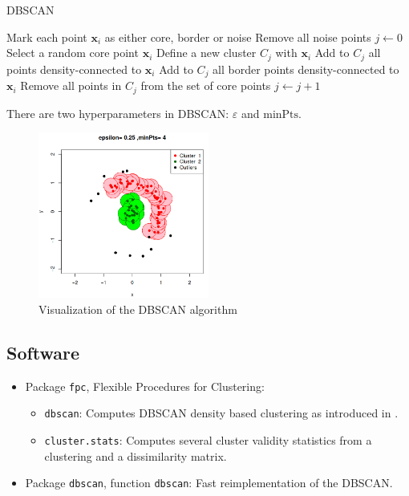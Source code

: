 \begin{algorithm}{DBSCAN}{}
    \begin{algorithmic}[1]
        \State Mark each point $\boldsymbol{x}_i$ as either core, border or noise
        \State Remove all noise points
        \State $j \gets 0$
            \State Select a random core point $\boldsymbol{x}_i$
            \State Define a new cluster $C_j$ with $\boldsymbol{x}_i$
            \State Add to $C_j$ all points density-connected to $\boldsymbol{x}_i$
            \State Add to $C_j$ all border points density-connected to $\boldsymbol{x}_i$
            \State Remove all points in $C_j$ from the set of core points
            \State $j \gets j + 1$
        \EndWhile
    \EndProcedure
\end{algorithmic}
\tcblower
\begin{marker}
There are two hyperparameters in DBSCAN: $\varepsilon$ and $\text{minPts}$.
\end{marker}
\end{algorithm}

\begin{figure}[H]
    \includegraphics[width=0.5\textwidth]{../figures/dbscan_eps_minpts}
    \caption{Visualization of the DBSCAN algorithm}
\end{figure}

\subsection{Software}

\begin{itemize}
	\item Package \texttt{fpc}, Flexible Procedures for Clustering:
	      \begin{itemize}
		      \item \texttt{dbscan}: Computes DBSCAN density based clustering as introduced
		            in \cite{ester_density-based_1996}.
		      \item \texttt{cluster.stats}: Computes several cluster validity statistics from a
		            clustering and a dissimilarity matrix.
	      \end{itemize}
	\item Package \texttt{dbscan}, function \texttt{dbscan}: Fast reimplementation of the
	      DBSCAN.
\end{itemize}
